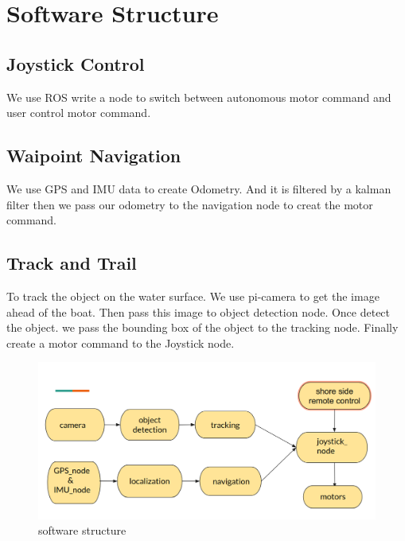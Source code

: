 \section{Software Structure}

\subsection{Joystick Control}

We use ROS write a node to switch between autonomous motor command and user control motor command.

\subsection{Waipoint Navigation}

We use GPS and IMU data to create Odometry. And it is filtered by a kalman filter then we pass our odometry to the navigation node to creat the motor command.

\subsection{Track and Trail}

To track the object on the water surface. We use pi-camera to get the image ahead of the boat. Then pass this image to object detection node. Once detect the object. we pass the bounding box of the object to the tracking node. Finally create a motor command to the Joystick node.

\begin{figure}[h]
	\includegraphics[width=0.8\columnwidth]{images/software_structure.png}
	\centering
	\caption{software structure}
	\label{figure:software_structure}
\end{figure}